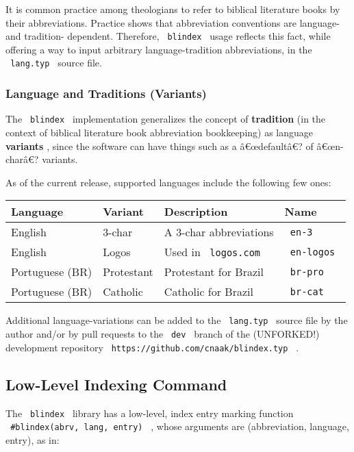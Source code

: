 It is common practice among theologians to refer to biblical literature
books by their abbreviations. Practice shows that abbreviation
conventions are language- and tradition- dependent. Therefore,
\texttt{\ blindex\ } usage reflects this fact, while offering a way to
input arbitrary language-tradition abbreviations, in the
\texttt{\ lang.typ\ } source file.

\subsubsection{Language and Traditions
(Variants)}\label{language-and-traditions-variants}

The \texttt{\ blindex\ } implementation generalizes the concept of
\textbf{tradition} (in the context of biblical literature book
abbreviation bookkeeping) as language \textbf{variants} , since the
software can have things such as a â€œdefaultâ€? of â€œn-charâ€?
variants.

As of the current release, supported languages include the following few
ones:

\begin{longtable}[]{@{}llll@{}}
\toprule\noalign{}
Language & Variant & Description & Name \\
\midrule\noalign{}
\endhead
\bottomrule\noalign{}
\endlastfoot
English & 3-char & A 3-char abbreviations & \texttt{\ en-3\ } \\
English & Logos & Used in \texttt{\ logos.com\ } &
\texttt{\ en-logos\ } \\
Portuguese (BR) & Protestant & Protestant for Brazil &
\texttt{\ br-pro\ } \\
Portuguese (BR) & Catholic & Catholic for Brazil &
\texttt{\ br-cat\ } \\
\end{longtable}

Additional language-variations can be added to the \texttt{\ lang.typ\ }
source file by the author and/or by pull requests to the
\texttt{\ dev\ } branch of the (UNFORKED!) development repository
\texttt{\ https://github.com/cnaak/blindex.typ\ } .

\subsection{Low-Level Indexing
Command}\label{low-level-indexing-command}

The \texttt{\ blindex\ } library has a low-level, index entry marking
function \texttt{\ \#blindex(abrv,\ lang,\ entry)\ } , whose arguments
are (abbreviation, language, entry), as in:

